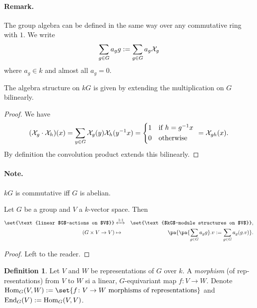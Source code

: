 \documentclass[12pt,a4paper]{scrartcl}
\theoremstyle{cplain}
\theoremstyle{cplain}
\theoremstyle{cplain}
\theoremstyle{definition}
\newtheorem*{deff}{Definition}
\begin{document}
\begin{otherlanguage}{english}
\paragraph{Remark.} The group algebra can be defined in the same way over any commutative ring with $1$. We write \[ \sum_{g \in G} a_g g := \sum_{g \in G} a_g \mathcal{X}_g \] where $a_g \in k$ and almost all $a_g = 0$.

\begin{lem}
  The algebra structure on $kG$ is given by extending the multiplication on $G$ bilinearly.
\end{lem}
\begin{proof}
  We have \[ (\Xs_g \cdot \Xs_h) (x) = \sum_{y \in G} \Xs_g(y) \Xs_h(y^{-1}x) = \begin{cases*}
                                                                                  1 & if $h = g^{-1}x$ \\
                                                                                  0 & otherwise
                                                                                \end{cases*} = \Xs_{gh}(x). \]
  By definition the convolution product extends this bilinearly.
\end{proof}

\paragraph{Note.} $kG$ is commutative iff $G$ is abelian.

\begin{lem} \label{lem:II.2}
  Let $G$ be a group and $V$ a $k$-vector space. Then
  \begin{eqnarray*}
    \set{\text{linear $G$-actions on $V$}} &\xleftrightarrow{1:1}& \set{\text{$kG$-module structures on $V$}}, \\
    (G \times V \to V) &\mapsto& \pa{\pa{\sum_{g\in G} a_g g}.v := \sum_{g\in G} a_g (g.v)}.
  \end{eqnarray*}
\end{lem}
\begin{proof}
  Left to the reader.
\end{proof}

\begin{deff}
  Let $V$ and $W$ be representations of $G$ over $k$. A \emph{morphism} (of representations) from $V$ to $W$ si a linear, $G$-equivariant map $f\colon V\to W$. Denote $\Hom_G(V,W) := \set{f \colon V \to W \text{ morphisms of representations}}$ and $\operatorname{End}_G(V) := \operatorname{Hom}_G(V,V)$.
\end{deff}


\end{otherlanguage}
\end{document}

